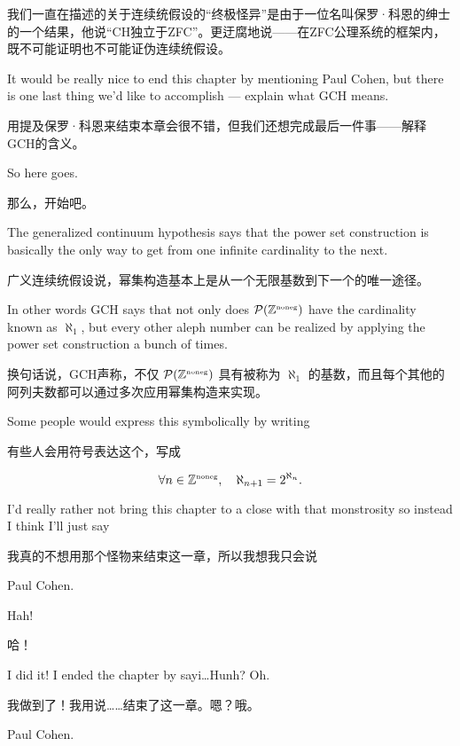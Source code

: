 我们一直在描述的关于连续统假设的“终极怪异”是由于一位名叫保罗·科恩的绅士的一个结果，他说“CH独立于ZFC”。更迂腐地说——在ZFC公理系统的框架内，既不可能证明也不可能证伪连续统假设。

It would be really nice to end this chapter by mentioning Paul Cohen, but there
is one last thing we'd like to accomplish --- explain what GCH means.

用提及保罗·科恩来结束本章会很不错，但我们还想完成最后一件事——解释GCH的含义。

So
here goes.

那么，开始吧。

The generalized continuum hypothesis says that the power set construction
is basically the only way to get from one infinite cardinality to the next.

广义连续统假设说，幂集构造基本上是从一个无限基数到下一个的唯一途径。

In other words GCH says that not only does ${\mathcal P}({\mathbb Z}^{\mbox{\tiny noneg}})$ have the
cardinality known as $\aleph_1$, but every other aleph number can be realized
by applying the power set construction a bunch of times.

换句话说，GCH声称，不仅 ${\mathcal P}({\mathbb Z}^{\mbox{\tiny noneg}})$ 具有被称为 $\aleph_1$ 的基数，而且每个其他的阿列夫数都可以通过多次应用幂集构造来实现。

Some people would
express this symbolically by writing

有些人会用符号表达这个，写成

\[ \forall n \in {\mathbb Z}^{\mbox{\tiny noneg}}, \quad \aleph_{n+1} = 2^{\aleph_n}.
\]

I'd really rather not bring this chapter to a close with that monstrosity
so instead I think I'll just say

我真的不想用那个怪物来结束这一章，所以我想我只会说

\centerline{Paul Cohen.}

Hah!

哈！

I did it! I ended the chapter by sayi\ldots Hunh?  Oh.

我做到了！我用说……结束了这一章。嗯？哦。

\newpage

Paul Cohen.


